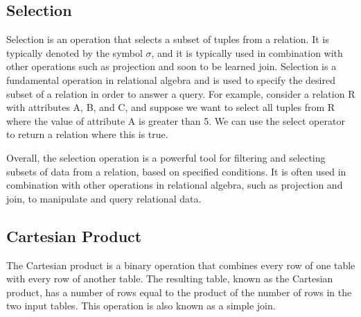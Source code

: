 \documentclass{report}
\begin{document}
        \subsection{Selection} 
            Selection is an operation that selects a subset of tuples from a relation. It is typically denoted by the symbol $\sigma$, and it is typically used in combination with other operations such as projection and soon to be learned join. Selection is a fundamental operation in relational algebra and is used to specify the desired subset of a relation in order to answer a query. For example, consider a relation R with attributes A, B, and C, and suppose we want to select all tuples from R where the value of attribute A is greater than 5. We can use the select operator to return a relation where this is true.


             Overall, the selection operation is a powerful tool for filtering and selecting subsets of data from a relation, based on specified conditions. It is often used in combination with other operations in relational algebra, such as projection and join, to manipulate and query relational data.

        \subsection{Cartesian Product}   

        The Cartesian product is a binary operation that combines every row of one table with every row of another table. The resulting table, known as the Cartesian product, has a number of rows equal to the product of the number of rows in the two input tables. This operation is also known as a simple join. 
\end{document}
